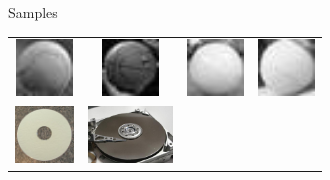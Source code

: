 \documentclass{beamer}
\newcommand{\samplesheight}{1.5cm}
\begin{document}
\begin{frame}{Samples}
\begin{table}[H]
\begin{tabularx}{\textwidth}{@{}cccc@{}}
			\includegraphics[height=\samplesheight]{training_images/positive/n02799071_17616.thumbnail.jpg} &
			\includegraphics[height=\samplesheight]{training_images/positive/n02802426_6256.thumbnail.jpg} &
			\includegraphics[height=\samplesheight]{training_images/positive/n03145719_8658.thumbnail.jpg} &
			\includegraphics[height=\samplesheight]{training_images/positive/n04409515_2793.thumbnail.jpg} \\
			\includegraphics[height=\samplesheight]{training_images/hard_negative/n03208556_9694} &
			\includegraphics[height=\samplesheight]{training_images/hard_negative/n03208556_11973} &

\end{tabularx}
\end{table}
\end{frame}
\end{document}
